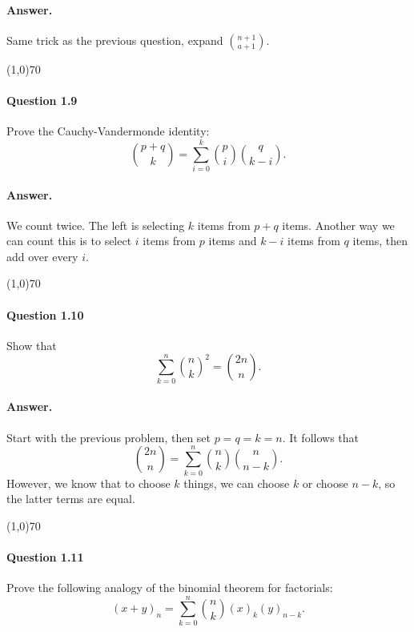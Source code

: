 \paragraph{Answer.} Same trick as the previous question, expand $\binom{n+1}{a+1}$.

 \begin{center}
 	\line(1,0){70}
 \end{center}

\paragraph{Question 1.9} Prove the Cauchy-Vandermonde identity:
$$\binom{p+q}{k}=\sum_{i=0}^k\binom{p}{i}\binom{q}{k-i}.$$

\paragraph{Answer.} We count twice. The left is selecting $k$ items from $p+q$ items. Another way we can count this is to select $i$ items from $p$ items and $k-i$ items from $q$ items, then add over every $i$.

\begin{center}
	\line(1,0){70}
\end{center}

\paragraph{Question 1.10} Show that
$$\sum_{k=0}^n\binom{n}{k}^2=\binom{2n}{n}.$$

\paragraph{Answer.} Start with the previous problem, then set $p=q=k=n$. It follows that
$$\binom{2n}{n}=\sum_{k=0}^n\binom{n}{k}\binom{n}{n-k}.$$ However, we know that to choose $k$ things, we can choose $k$ or choose $n-k$, so the latter terms are equal.

\begin{center}
	\line(1,0){70}
\end{center}

\paragraph{Question 1.11} Prove the following analogy of the binomial theorem for factorials:
$$(x+y)_n = \sum_{k=0}^n\binom{n}{k}(x)_k(y)_{n-k}.$$

